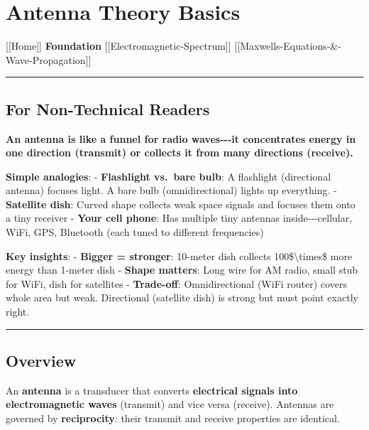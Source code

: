 \section{Antenna Theory Basics}\label{antenna-theory-basics}

{[}{[}Home{]}{]} \textbar{} \textbf{Foundation} \textbar{}
{[}{[}Electromagnetic-Spectrum{]}{]} \textbar{}
{[}{[}Maxwell\textquotesingle s-Equations-\&-Wave-Propagation{]}{]}

\begin{center}\rule{0.5\linewidth}{0.5pt}\end{center}

\subsection{\texorpdfstring{ For Non-Technical
Readers}{ For Non-Technical Readers}}\label{for-non-technical-readers}

\textbf{An antenna is like a funnel for radio waves-\/-\/-it
concentrates energy in one direction (transmit) or collects it from many
directions (receive).}

\textbf{Simple analogies}: - \textbf{Flashlight vs.~bare bulb}: A
flashlight (directional antenna) focuses light. A bare bulb
(omnidirectional) lights up everything. - \textbf{Satellite dish}:
Curved shape collects weak space signals and focuses them onto a tiny
receiver - \textbf{Your cell phone}: Has multiple tiny antennas
inside-\/-\/-cellular, WiFi, GPS, Bluetooth (each tuned to different
frequencies)

\textbf{Key insights}: - \textbf{Bigger = stronger}: 10-meter dish
collects 100\$\textbackslash times\$ more energy than 1-meter dish -
\textbf{Shape matters}: Long wire for AM radio, small stub for WiFi,
dish for satellites - \textbf{Trade-off}: Omnidirectional (WiFi router)
covers whole area but weak. Directional (satellite dish) is strong but
must point exactly right.

\begin{center}\rule{0.5\linewidth}{0.5pt}\end{center}

\subsection{Overview}\label{overview}

An \textbf{antenna} is a transducer that converts \textbf{electrical
signals into electromagnetic waves} (transmit) and vice versa (receive).
Antennas are governed by \textbf{reciprocity}: their transmit and
receive properties are identical.

